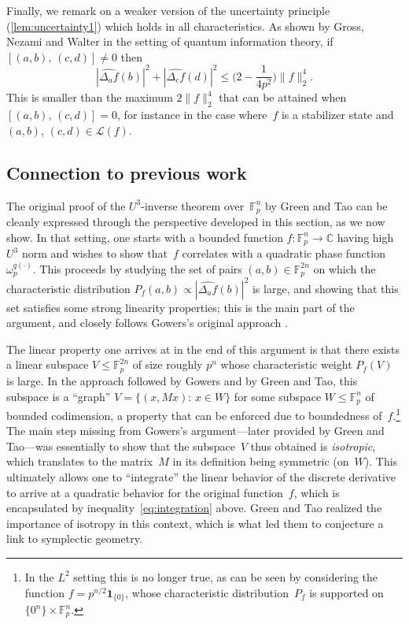 \documentclass[11pt]{amsart}
\newcommand{\C}{\mathbb{C}} %
\newcommand{\F}{\mathbb{F}} %
\newcommand{\Lcal}{\mathcal{L}}
\newcommand{\one}{\mathbf{1}}
\theoremstyle{plain}
\theoremstyle{definition}
\theoremstyle{remark}
\begin{document}
Finally, we remark on a weaker version of the uncertainty principle (\cref{lem:uncertainty1}) which holds in all characteristics.
As shown by Gross, Nezami and Walter \cite[Lemma~3.10]{Gross2021} in the setting of quantum information theory, if $[(a,b),\, (c,d)] \neq 0$ then
$$|\widehat{\Delta_af}(b)|^2 + |\widehat{\Delta_cf}(d)|^2 \leq \bigg(2 - \frac{1}{4p^2}\bigg) \|f\|_2^4.$$
This is smaller than the maximum $2\|f\|_2^4$ that can be attained when $[(a,b),\, (c,d)] = 0$, for instance in the case where~$f$ is a stabilizer state and $(a,b)$, $(c,d) \in \Lcal(f)$.


\subsection{Connection to previous work}

The original proof of the $U^3$-inverse theorem over~$\F_p^n$ by Green and Tao \cite{GreenTao2008} can be cleanly expressed through the perspective developed in this section, as we now show.
In that setting, one starts with a bounded function $f: \F_p^n \to \C$ having high $U^3$ norm and wishes to show that~$f$ correlates with a quadratic phase function $\omega_p^{q(\cdot)}$.
This proceeds by studying the set of pairs $(a, b) \in \F_p^{2n}$ on which the characteristic distribution $P_f(a,b) \propto |\widehat{\Delta_af}(b)|^2$ is large, and showing that this set satisfies some strong linearity properties;
this is the main part of the argument, and closely follows Gowers's original approach \cite{Gowers1998}.

The linear property one arrives at in the end of this argument is that there exists a linear subspace $V \leq \F_p^{2n}$ of size roughly $p^n$ whose characteristic weight $P_f(V)$ is large.
In the approach followed by Gowers and by Green and Tao, this subspace is a ``graph'' $V = \{(x, Mx):\, x\in W\}$ for some subspace $W\leq \F_p^n$ of bounded codimension, a property that can be enforced due to boundedness of~$f$.\footnote{In the $L^2$ setting this is no longer true, as can be seen by considering the function $f = p^{n/2} \one_{\{0\}}$, whose characteristic distribution~$P_f$ is supported on $\{0^n\}\times \F_p^n$.}
The main step missing from Gowers's argument---later provided by Green and Tao---was essentially to show that the subspace~$V$ thus obtained is \emph{isotropic}, which translates to the matrix~$M$ in its definition being symmetric (on~$W$).
This ultimately allows one to ``integrate'' the linear behavior of the discrete derivative to arrive at a quadratic behavior for the original function~$f$, which is encapsulated by inequality~\eqref{eq:integration} above.
Green and Tao realized the importance of isotropy in this context, which is what led them to conjecture a link to symplectic geometry.
\end{document}
